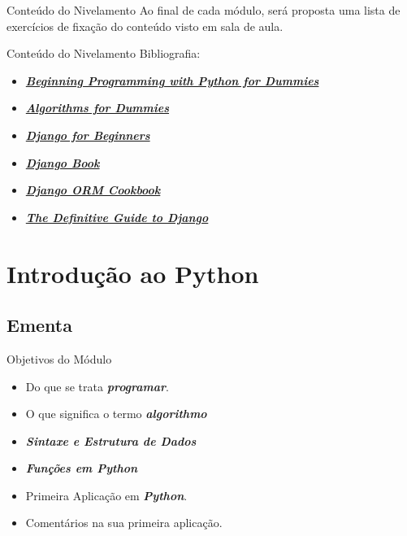 \documentclass{beamer}
\begin{document}
\begin{frame}{Conteúdo do Nivelamento}
	Ao final de cada módulo, será proposta uma lista de exercícios de fixação do conteúdo visto em sala de aula.
\end{frame}

\begin{frame}{Conteúdo do Nivelamento}
	Bibliografia:
	\begin{itemize}
		\item \href{bibliografia/Beginning Programming with Python for Dummies.pdf}{\textbf{\textit{Beginning Programming with Python for Dummies}}}
		\item \href{bibliografia/Algorithms For Dummies.pdf}{\textbf{\textit{Algorithms for Dummies}}}
		\item \href{bibliografia/django-for-beginners-build-websites-with-python-amp-django_compress.pdf}{\textbf{\textit{Django for Beginners}}}
		\item \href{https://django-book.readthedocs.io/en/latest/}{\textbf{\textit{Django Book}}}
		\item \href{https://books.agiliq.com/projects/django-orm-cookbook/en/latest/}{\textbf{\textit{Django ORM Cookbook}}}
		\item \href{bibliografia/The Definitive Guide to Django - Apress.pdf}{\textbf{\textit{The Definitive Guide to Django}}}
	\end{itemize}
\end{frame}

\section{Introdução ao Python}
\subsection{Ementa}
\begin{frame}{Objetivos do Módulo}
\begin{itemize}
	\item Do que se trata \textbf{\textit{programar}}.
	\item O que significa o termo \textbf{\textit{algorithmo}}
	\item \textbf{\textit{Sintaxe e Estrutura de Dados}}
	\item \textbf{\textit{Funções em Python}}
	\item Primeira Aplicação em \textbf{\textit{Python}}.
	\item Comentários na sua primeira aplicação.
\end{itemize}
\end{frame}
\end{document}
